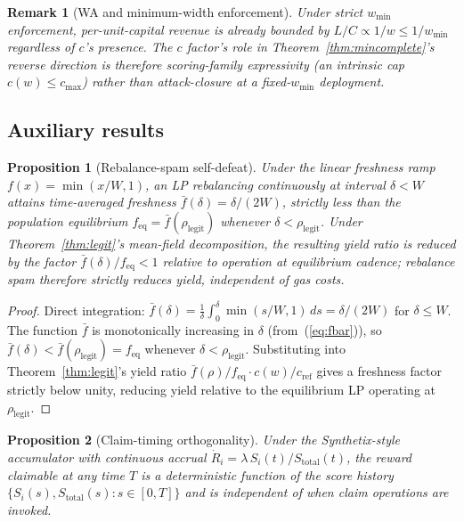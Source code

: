 \documentclass[11pt,a4paper]{article}
\theoremstyle{cgdefinition}
\theoremstyle{cgplain}
\newtheorem{proposition}{Proposition}
\theoremstyle{cgremark}
\newtheorem{remark}{Remark}
\begin{document}
\begin{remark}[WA and minimum-width enforcement]\label{rem:wa-wmin}
Under strict $w_{\min}$ enforcement, per-unit-capital revenue is already bounded by $L/C \propto 1/w \leq 1/w_{\min}$ regardless of $c$'s presence. The $c$ factor's role in Theorem~\ref{thm:mincomplete}'s reverse direction is therefore scoring-family expressivity (an intrinsic cap $c(w) \leq c_{\max}$) rather than attack-closure at a fixed-$w_{\min}$ deployment.
\end{remark}

\subsection{Auxiliary results}\label{sec:auxiliary}

\begin{proposition}[Rebalance-spam self-defeat]\label{prop:spam}
Under the linear freshness ramp $f(x) = \min(x/W, 1)$, an LP rebalancing continuously at interval $\delta < W$ attains time-averaged freshness $\bar f(\delta) = \delta/(2W)$, strictly less than the population equilibrium $f_{\text{eq}} = \bar f(\rho_{\text{legit}})$ whenever $\delta < \rho_{\text{legit}}$. Under Theorem~\ref{thm:legit}'s mean-field decomposition, the resulting yield ratio is reduced by the factor $\bar f(\delta)/f_{\text{eq}} < 1$ relative to operation at equilibrium cadence; rebalance spam therefore strictly reduces yield, independent of gas costs.
\end{proposition}

\begin{proof}
Direct integration: $\bar f(\delta) = \frac{1}{\delta}\int_0^\delta \min(s/W, 1)\,ds = \delta/(2W)$ for $\delta \leq W$. The function $\bar f$ is monotonically increasing in $\delta$ (from~(\ref{eq:fbar})), so $\bar f(\delta) < \bar f(\rho_{\text{legit}}) = f_{\text{eq}}$ whenever $\delta < \rho_{\text{legit}}$. Substituting into Theorem~\ref{thm:legit}'s yield ratio $\bar f(\rho)/f_{\text{eq}} \cdot c(w)/c_{\text{ref}}$ gives a freshness factor strictly below unity, reducing yield relative to the equilibrium LP operating at $\rho_{\text{legit}}$.
\end{proof}

\begin{proposition}[Claim-timing orthogonality]\label{prop:claim-timing}
Under the Synthetix-style accumulator with continuous accrual $\dot R_i = \lambda\,S_i(t)/S_{\text{total}}(t)$, the reward claimable at any time $T$ is a deterministic function of the score history $\{S_i(s), S_{\text{total}}(s) : s \in [0, T]\}$ and is independent of when claim operations are invoked.
\end{proposition}
\end{document}
